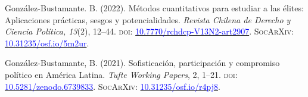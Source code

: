 \begin{publications}

\begin{benumerate}{14}


\item{González-Bustamante. B. (2022). Métodos cuantitativos para estudiar a las élites: Aplicaciones prácticas, sesgos y potencialidades. {\itshape Revista Chilena de Derecho y Ciencia Política, 13}(2), 12--44. {\scshape doi:} \href{https://doi.org/10.7770/rchdcp-V13N2-art2907}{\textcolor{blue}{10.7770/rchdcp-V13N2-art2907}}. {\scshape \footnotesize SocArXiv:} \href{https://doi.org/10.31235/osf.io/5m2ur}{\textcolor{blue}{10.31235/osf.io/5m2ur}}.}\vspace{1mm}


\item{González-Bustamante, B. (2021). Sofisticación, participación y compromiso político en América Latina. {\itshape Tufte Working Papers}, 2, 1--21. {\scshape doi:} \href{https://doi.org/10.5281/zenodo.6739833}{\textcolor{blue}{10.5281/zenodo.6739833}}. {\scshape \footnotesize SocArXiv:} \href{https://doi.org/10.31235/osf.io/r4pj8}{\textcolor{blue}{10.31235/osf.io/r4pj8}}.}\vspace{1mm}



\end{benumerate}
\end{publications}
